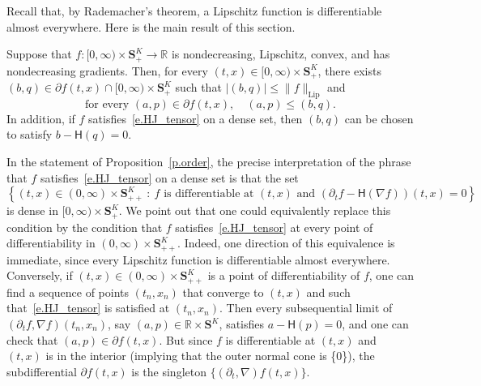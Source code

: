 \documentclass[AHL,Unicode,longabstracts,published]{cedram}
\newcommand{\R}{\mathbb{R}}
\renewcommand{\S}{\mathbf{S}}
\newcommand{\Lip}{\mathrm{Lip}}
\renewcommand{\H}{\mathsf{H}}
\renewcommand{\leq}{\leqslant}
\newcommand{\Ll}{\left}
\newcommand{\Rr}{\right}
\newcommand{\dr}{\partial}
\newcommand{\msf}{\mathsf}
\begin{document}
Recall that, by Rademacher's theorem, a Lipschitz function is differentiable almost everywhere. Here is the main result of this section.



\begin{prop}\label{p.order}
Suppose that $f:[0,\infty)\times \S^K_+\to \R$ is nondecreasing, Lipschitz, convex, and has nondecreasing gradients. Then, for every $(t,x)\in [0,\infty)\times \S^K_+ $, there exists $(b,q)\in\partial f(t,x)\cap [0,\infty)\times \S^K_+$ such that $|(b,q)|\leq \|f\|_{\Lip}$ and
\begin{equation}\label{e.l.order}
\text{for every } (a,p)\in \partial f(t,x), \quad (a,p)\leq (b,q).
\end{equation}
In addition, if $f$ satisfies~\eqref{e.HJ_tensor} on a dense set, then $(b,q)$ can be chosen to satisfy $b-\H(q)= 0$.
\end{prop}

\begin{rema}\label{r.ae.diff}
In the statement of Proposition~\ref{p.order}, the precise interpretation of the phrase that $f$ satisfies~\eqref{e.HJ_tensor} on a dense set is that the set
\begin{equation*}
\Ll\{ (t,x) \in (0,\infty)\times \S^K_{++} \ : \ \text{$f$ is differentiable at $(t,x)$ and } \left(\dr_t f - \msf H(\nabla f) \right) (t,x) = 0 \Rr\}
\end{equation*}
is dense in $[0,\infty) \times \S^K_+$. We point out that one could equivalently replace this condition by the condition that $f$ satisfies~\eqref{e.HJ_tensor} at every point of differentiability in $(0,\infty) \times \S^K_{++}$. Indeed, one direction of this equivalence is immediate, since every Lipschitz function is differentiable almost everywhere. Conversely, if $(t,x) \in (0,\infty) \times \S^K_{++}$ is a point of differentiability of $f$, one can find a sequence of points $(t_n,x_n)$ that converge to $(t,x)$ and such that~\eqref{e.HJ_tensor} is satisfied at $(t_n,x_n)$. Then every subsequential limit of $(\dr_t f, \nabla f)(t_n,x_n)$, say $(a,p) \in \R \times \S^K$, satisfies $a - \msf H(p) = 0$, and one can check that $(a,p) \in \dr f(t,x)$. But since $f$ is differentiable at $(t,x)$ and $(t,x)$ is in the interior (implying that the outer normal cone is \{0\}), the subdifferential $\dr f(t,x)$ is the singleton $\{(\dr_t, \nabla)f(t,x)\}$.
\end{rema}
\end{document}
